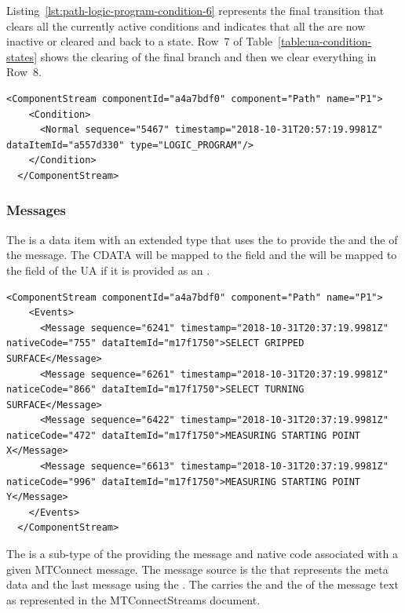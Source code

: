 Listing~\ref{lst:path-logic-program-condition-6} represents the final  transition that clears all the currently active conditions and indicates that all the  are now inactive or cleared and back to a  state. Row~7 of Table~\ref{table:ua-condition-states} shows the clearing of the final branch and then we clear everything in Row~8.

\begin{lstlisting}[firstnumber=last,escapechar=|,%
    caption={Path Logic Program Back to Normal, All Clear},label={lst:path-logic-program-condition-6}]
  <ComponentStream componentId="a4a7bdf0" component="Path" name="P1">
    <Condition>
      <Normal sequence="5467" timestamp="2018-10-31T20:57:19.9981Z" dataItemId="a557d330" type="LOGIC_PROGRAM"/>
    </Condition>
  </ComponentStream>
\end{lstlisting}

\subsubsection{Messages}

The  is a data item with an extended type that uses the  to provide the  and the  of the message. The \gls{CDATA} will be mapped to the  field and the  will be mapped to the field of the UA  if it is provided as an .

\begin{lstlisting}[firstnumber=last,escapechar=|,%
    caption={Path Motion Program Normal},label={lst:path-motion-program-condition-3}]
  <ComponentStream componentId="a4a7bdf0" component="Path" name="P1">
    <Events>
      <Message sequence="6241" timestamp="2018-10-31T20:37:19.9981Z" nativeCode="755" dataItemId="m17f1750">SELECT GRIPPED SURFACE</Message>
      <Message sequence="6261" timestamp="2018-10-31T20:37:19.9981Z" naticeCode="866" dataItemId="m17f1750">SELECT TURNING SURFACE</Message>
      <Message sequence="6422" timestamp="2018-10-31T20:37:19.9981Z" naticeCode="472" dataItemId="m17f1750">MEASURING STARTING POINT X</Message>
      <Message sequence="6613" timestamp="2018-10-31T20:37:19.9981Z" naticeCode="996" dataItemId="m17f1750">MEASURING STARTING POINT Y</Message>
    </Events>
  </ComponentStream>
\end{lstlisting}

The  is a sub-type of the  providing the message and native code associated with a given MTConnect message. The message source is the   that represents the meta data and the last message using the . The  carries the  and the  of the message text as represented in the MTConnectStreams document.

